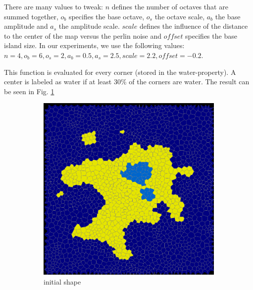 \documentclass[journal, letterpaper]{IEEEtran}
\begin{document}
There are many values to tweak: $n$ defines the number of octaves that are summed together, $o_b$ specifies the base octave, $o_s$ the octave scale, $a_b$ the base amplitude and $a_s$ the amplitude scale. $scale$ defines the influence of the distance to the center of the map versus the perlin noise and $offset$ specifies the base island size.
In our experiments, we use the following values: $n=4, o_b=6, o_s=2, a_b=0.5, a_s=2.5, scale=2.2, offset=-0.2$.

This function is evaluated for every corner (stored in the water-property). A center is labeled as water if at least 30\% of the corners are water.
The result can be seen in Fig. \ref{fig:shape}

\begin{figure}
	\centering
	\begin{subfigure}[b]{0.3\textwidth}
		\includegraphics[width=\textwidth]{images/elevation1}
		\caption{initial shape}
		\label{fig:shape}
	\end{subfigure}
	\begin{subfigure}[b]{0.3\textwidth}

\end{subfigure}
\end{figure}
\end{document}
